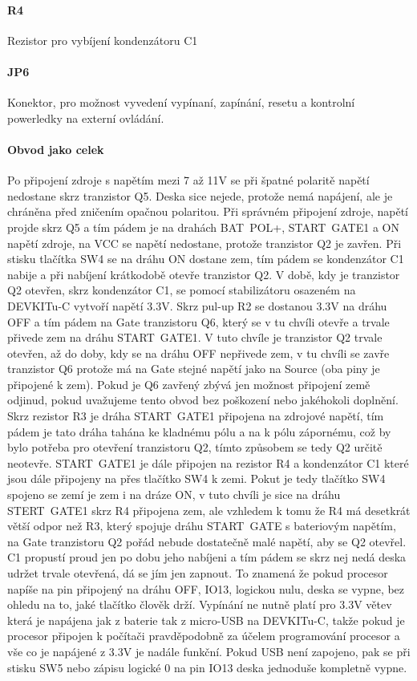 \documentclass{template/socthesis}
\begin{document}
\begin{itemize}
	\paragraph*{R4}
	Rezistor pro vybíjení kondenzátoru C1
	
	\paragraph*{JP6}
	Konektor, pro možnost vyvedení vypínaní, zapínání, resetu 
	a kontrolní powerledky na externí ovládání.
	
	\paragraph*{Obvod jako celek}
	Po připojení zdroje s napětím mezi 7 až 11V se při špatné polaritě napětí nedostane skrz tranzistor Q5. Deska sice nejede, protože nemá napájení, ale je chráněna před zničením opačnou polaritou. Při správném připojení zdroje, napětí projde skrz Q5 a tím pádem je na drahách BAT~POL+, START~GATE1 a ON napětí zdroje, na VCC se napětí nedostane, protože tranzistor Q2 je zavřen. Při stisku tlačítka SW4 se na dráhu ON dostane zem, tím pádem se kondenzátor C1 nabije a při nabíjení krátkodobě otevře tranzistor Q2. V době, kdy je tranzistor Q2 otevřen, skrz kondenzátor C1, se pomocí stabilizátoru osazeném na DEVKITu-C vytvoří napětí 3.3V. Skrz pul-up R2 se dostanou 3.3V na dráhu OFF a tím pádem na Gate tranzistoru Q6, který se v tu chvíli otevře a trvale přivede zem na dráhu START~GATE1. V tuto chvíle je tranzistor Q2 trvale otevřen, až do doby, kdy se na dráhu OFF nepřivede zem, v tu chvíli se zavře tranzistor Q6 protože má na Gate stejné napětí jako na Source (oba piny je připojené k zem). Pokud je Q6 zavřený zbývá jen možnost připojení země odjinud, pokud uvažujeme tento obvod bez poškození nebo jakéhokoli doplnění. Skrz rezistor R3 je dráha START~GATE1 připojena na zdrojové napětí, tím pádem je tato dráha tahána ke kladnému pólu a na k pólu zápornému, což by bylo potřeba pro otevření tranzistoru Q2, tímto způsobem se tedy Q2 určitě neotevře.
	START~GATE1 je dále připojen na rezistor R4 a kondenzátor C1 které jsou dále připojeny na přes tlačítko SW4 k zemi. Pokut je tedy tlačítko SW4 spojeno se zemí je zem i na dráze ON, v tuto chvíli je sice na dráhu 
	STERT~GATE1 skrz R4 připojena zem, ale vzhledem
	k tomu že R4 má desetkrát větší odpor než R3, který spojuje dráhu START~GATE s bateriovým napětím, na Gate tranzistoru Q2 pořád nebude dostatečně malé napětí, aby se Q2 otevřel. C1 propustí proud jen po dobu jeho nabíjeni a tím pádem se skrz nej nedá deska udržet trvale otevřená, dá se jím jen zapnout. To znamená že pokud procesor napíše na pin připojený na dráhu OFF, IO13, logickou nulu, deska se vypne, bez ohledu na to, jaké tlačítko člověk drží. Vypínání ne nutně platí pro 3.3V větev která je napájena jak z baterie tak z micro-USB na DEVKITu-C, takže pokud je procesor připojen k počítači pravděpodobně za účelem programování procesor a vše co je napájené z 3.3V je nadále funkční. Pokud USB není zapojeno, pak se při stisku SW5 nebo zápisu logické 0
	na pin IO13 deska jednoduše kompletně vypne.
	

\end{itemize}
\end{document}
